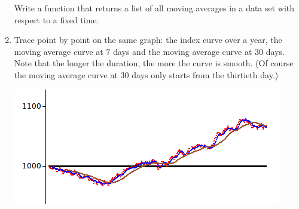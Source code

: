 \documentclass[11pt,class=report,crop=false]{standalone}
\begin{document}
\begin{activite}
\begin{enumerate}
   Write a function  that returns a list of all moving averages in a data set with respect to a fixed time.
   
    \item Trace point by point on the same graph: the index curve over a year, the moving average curve at $7$ days and the moving average curve at $30$ days. Note that the longer the duration, the more the curve is \og{}smooth\fg{}. (Of course the moving average curve at $30$ days only starts from the thirtieth day.)
   
\begin{center}
\includegraphics[scale=\myscale,scale=0.8]{screen-stat-5b}
\end{center}

\end{enumerate}

\end{activite}
\end{document}
